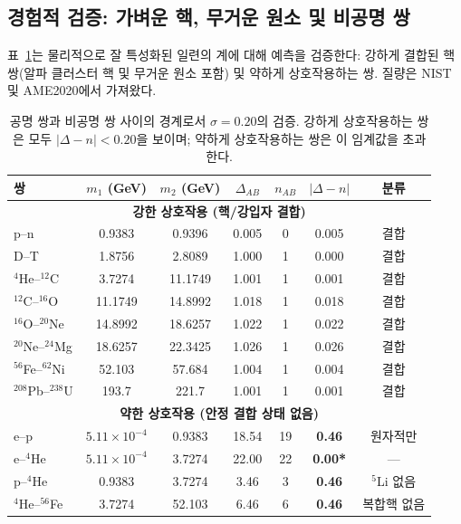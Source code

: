 \documentclass[11pt,a4paper]{article}
\theoremstyle{remark}
\begin{document}
	\subsection{경험적 검증: 가벼운 핵, 무거운 원소 및 비공명 쌍}
	
	표~\ref{tab:sigma_validation_heavy}는 물리적으로 잘 특성화된 일련의 계에 대해 예측을 검증한다: 강하게 결합된 핵쌍(알파 클러스터 핵 및 무거운 원소 포함) 및 약하게 상호작용하는 쌍. 질량은 NIST 및 AME2020에서 가져왔다.
	
	\begin{table}[H]
		\centering
		\caption{공명 쌍과 비공명 쌍 사이의 경계로서 \(\sigma = 0.20\)의 검증. 강하게 상호작용하는 쌍은 모두 \(|\Delta-n| < 0.20\)을 보이며; 약하게 상호작용하는 쌍은 이 임계값을 초과한다.}
		\label{tab:sigma_validation_heavy}
		\small
		\begin{tabular}{l c c c c c c}
			\toprule
			쌍 & \(m_1\) (GeV) & \(m_2\) (GeV) & \(\Delta_{AB}\) & \(n_{AB}\) & \(|\Delta-n|\) & 분류 \\
			\midrule
			\multicolumn{7}{c}{\textbf{강한 상호작용 (핵/강입자 결합)}} \\
			p--n           & 0.9383 & 0.9396 & 0.005  & 0 & 0.005 & 결합 \\
			D--T           & 1.8756 & 2.8089 & 1.000  & 1 & 0.000 & 결합 \\
			$^4$He--$^{12}$C  & 3.7274 & 11.1749& 1.001  & 1 & 0.001 & 결합 \\
			$^{12}$C--$^{16}$O & 11.1749& 14.8992& 1.018  & 1 & 0.018 & 결합 \\
			$^{16}$O--$^{20}$Ne& 14.8992& 18.6257& 1.022  & 1 & 0.022 & 결합 \\
			$^{20}$Ne--$^{24}$Mg& 18.6257& 22.3425& 1.026  & 1 & 0.026 & 결합 \\
			$^{56}$Fe--$^{62}$Ni& 52.103 & 57.684 & 1.004  & 1 & 0.004 & 결합 \\
			$^{208}$Pb--$^{238}$U& 193.7  & 221.7  & 1.001  & 1 & 0.001 & 결합 \\
			\midrule
			\multicolumn{7}{c}{\textbf{약한 상호작용 (안정 결합 상태 없음)}} \\
			e--p           & $5.11\times10^{-4}$ & 0.9383 & 18.54  & 19 & \textbf{0.46} & 원자적만 \\
			e--$^4$He      & $5.11\times10^{-4}$ & 3.7274 & 22.00  & 22 & \textbf{0.00*} & — \\
			p--$^4$He      & 0.9383 & 3.7274 & 3.46   & 3  & \textbf{0.46} & $^5$Li 없음 \\
			$^4$He--$^{56}$Fe & 3.7274 & 52.103 & 6.46   & 6  & \textbf{0.46} & 복합핵 없음 \\

\end{tabular}
\end{table}
\end{document}
